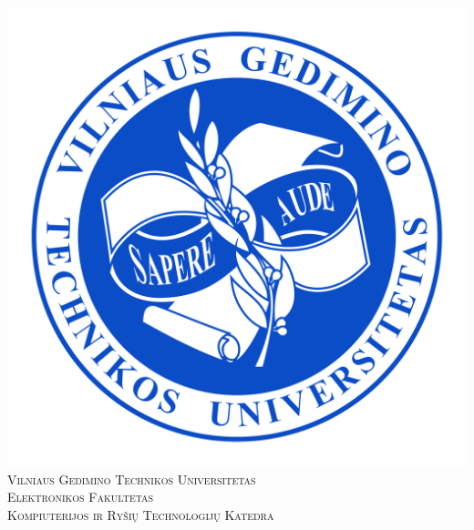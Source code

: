 \documentclass[12pt]{article}
\begin{document}


\begin{titlepage}
\centering

    \vspace*{-9.5pt}
    \includegraphics[scale = 0.105]{Herbas.png}           \\[3.9pt]

{\scshape
    {\Large Vilniaus Gedimino Technikos Universitetas}    \\[1.30pt]
    {\large Elektronikos Fakultetas}                      \\[0.20pt]
    {\large Kompiuterijos ir Ryšių Technologijų Katedra}  \\[106.0pt]
}



\end{titlepage}
\end{document}
